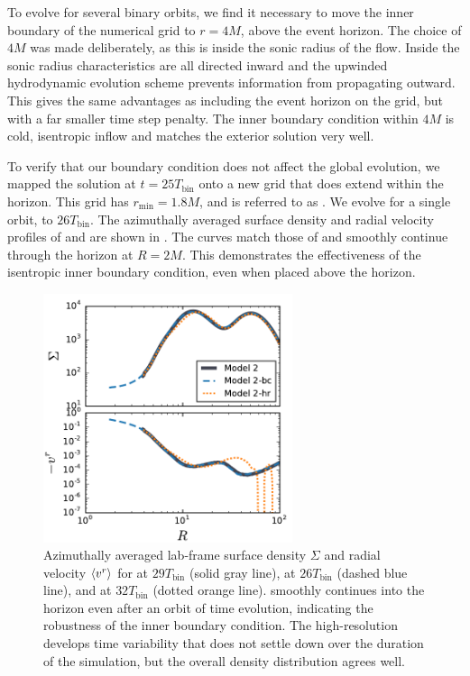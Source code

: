 To evolve for several binary orbits, we find it necessary to move the inner boundary of the numerical grid to $r=4M$, above the event horizon.  The choice of $4M$ was made deliberately, as this is inside the sonic radius of the flow. Inside the sonic radius characteristics are all directed inward and the upwinded hydrodynamic evolution scheme prevents information from propagating outward.  This gives the same advantages as including the event horizon on the grid, but with a far smaller time step penalty.  The inner boundary condition within $4M$ is cold, isentropic inflow and matches the exterior solution very well.

To verify that our boundary condition does not affect the global evolution, we mapped the  solution at $t=25 T_\text{bin}$ onto a new grid that does extend within the horizon.  This grid has $r_\text{min} = 1.8M$, and is referred to as .  We evolve  for a single orbit, to $26T_\text{bin}$.  The azimuthally averaged surface density and radial velocity profiles of  and  are shown in .  The  curves match those of  and smoothly continue through the horizon at $R=2M$.  This demonstrates the effectiveness of the isentropic inner boundary condition, even when placed above the horizon.

\begin{figure}
	\begin{center}
	\includegraphics[width=0.65\textwidth]{figures/minidisk/q011_bc_hr_comp.pdf}
	\end{center}
	\caption{ Azimuthally averaged lab-frame surface density $\Sigma$ and radial velocity $\left \langle v^r \right \rangle$ for  at $29T_\text{bin}$ (solid gray line),  at $26T_\text{bin}$ (dashed blue line), and   at $32T_\text{bin}$ (dotted orange line).  smoothly continues  into the horizon even after an orbit of time evolution, indicating the robustness of the inner boundary condition.  The high-resolution  develops time variability that does not settle down over the duration of the simulation, but the overall density distribution agrees well.}
\end{figure}

